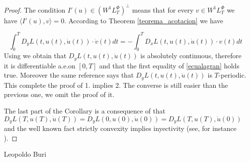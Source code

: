 \documentclass[twoside]{article}
\newcommand{\lphi}{L^{\Phi}}
\newcommand{\wphi}{W^{1}\lphi}
\begin{document}
\begin{proof} The condition $I'(u)\in\left( \wphi_T\right)^{\perp}$ means that for every $v\in \wphi_T$ we have $\langle I'(u),v\rangle=0$. According to Theorem
\ref{teorema_acotacion} we have

\[\int_0^TD_yL(t,u(t),\dot{u}(t))\cdot \dot{v}(t)dt=-\int_0^TD_xL(t,u(t),\dot{u}(t))\cdot v(t)dt \]
Using \cite[pag. 6]{mawhin2010critical} we obtain that $D_yL(t,u(t),\dot{u}(t))$ is absolutely continuous, therefore it is differentiable a.e.on $[0,T]$ and that the first equality 
of \ref{ecualagran} holds true. Moreover the same reference says that $D_yL(t,u(t),\dot{u}(t))$ is $T$-periodic. 
This complete the proof of 1. implies 2. The converse is still easier than the previous one, we omit the proof of it. 

The last part of the Corollary is a consequence of that $D_yL(T,u(T),\dot{u}(T))=D_yL(0,u(0),\dot{u}(0))=D_yL(T,u(T),\dot{u}(0))$ and the well known fact
strictly convexity implies inyectivity (see, for instance \cite[Theorem
12.17]{rockafellar2009variational}).

\end{proof}
Leopoldo Buri



\end{document}
